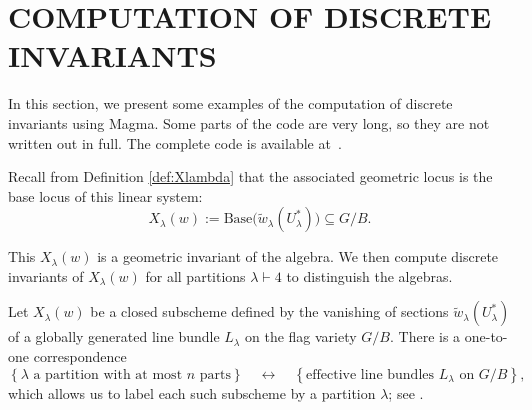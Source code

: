 \documentclass{amsart}
\begin{document}
\section{COMPUTATION OF DISCRETE INVARIANTS}\label{sec:discrete-invariants}

In this section, we present some examples of the computation of discrete invariants using Magma. Some parts of the code are very long, so they are not written out in full. The complete code is available at~\cite{vishal2025}. 

Recall from Definition \ref{def:Xlambda} that the associated geometric locus is the base locus of this linear system:
\[
X_\lambda(w) := \mathrm{Base}\big(\widetilde{w}_\lambda(U_\lambda^*)\big) \subseteq G/B.
\]

This $X_\lambda(w)$ is a geometric invariant of the algebra. We then compute discrete invariants of \(X_\lambda(w)\) for all partitions \(\lambda \vdash 4\) to distinguish the algebras.

\begin{definition}
Let \( X_\lambda(w) \) be a closed subscheme defined by the vanishing of sections $\widetilde{w}_\lambda(U_\lambda^*)$ of a globally generated line bundle \( L_\lambda \) on the flag variety \( G/B \). There is a one-to-one correspondence
\[
  \left\{ \lambda \text{ a partition with at most } n \text{ parts} \right\}
  \quad \longleftrightarrow \quad
  \left\{ \text{effective line bundles } L_\lambda \text{ on } G/B \right\},
\]
which allows us to label each such subscheme by a partition \( \lambda \); see \cite[page 393]{fulton1991representation}.
\end{definition}


\end{document}
